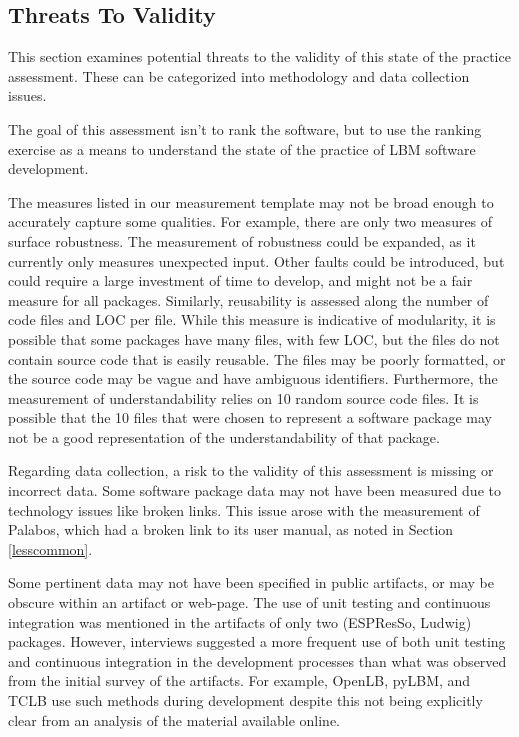 \documentclass[12pt, notitlepage]{article}
\begin{document}
\subsection{Threats To Validity}\label{threats}

This section examines potential threats to the validity of this state of the practice assessment. These can be categorized into methodology and data collection issues. 

The goal of this assessment isn't to rank the software, but to use the ranking exercise as a means to understand the state of the practice of LBM software development.

The measures listed in our measurement template may not be broad enough to accurately capture some qualities. For example, there are only two measures of surface robustness. The measurement of robustness could be expanded, as it currently only measures unexpected input. Other faults could be introduced, but could require a large investment of time to develop, and might not be a fair measure for all packages. Similarly, reusability is assessed along the number of code files and LOC per file. While this measure is indicative of modularity, it is possible that some packages have many files, with few LOC, but the files do not contain source code that is easily reusable. The files may be poorly formatted, or the source code may be vague and have ambiguous identifiers. Furthermore, the measurement of understandability relies on 10 random source code files. It is possible that the 10 files that were chosen to represent a software package may not be a good representation of the understandability of that package.

Regarding data collection, a risk to the validity of this assessment is missing or incorrect data. Some software package data may not have been measured due to technology issues like broken links. This issue arose with the measurement of Palabos, which had a broken link to its user manual, as noted in Section \ref{lesscommon}. 

Some pertinent data may not have been specified in public artifacts, or may be obscure within an artifact or web-page. The use of unit testing and continuous integration was mentioned in the artifacts of only two (ESPResSo, Ludwig) packages. However, interviews suggested a more frequent use of both unit testing and continuous integration in the development processes than what was observed from the initial survey of the artifacts. For example, OpenLB, pyLBM, and TCLB use such methods during development despite this not being explicitly clear from an analysis of the material available online. 
\end{document}
